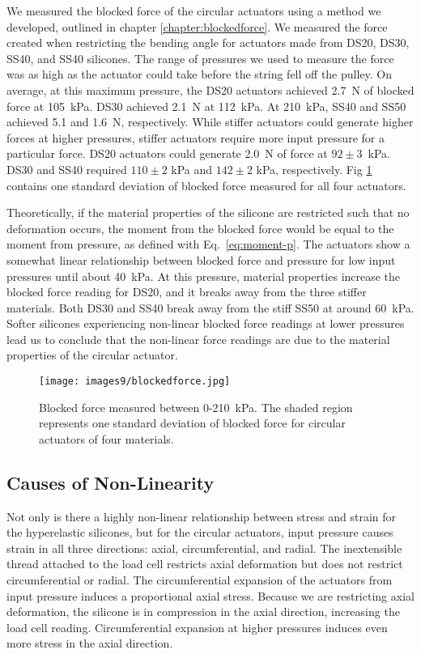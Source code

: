 We measured the blocked force of the circular actuators using a method we developed, outlined in chapter \ref{chapter:blockedforce}. We measured the force created when restricting the bending angle for actuators made from DS20, DS30, SS40, and SS40 silicones. The range of pressures we used to measure the force was as high as the actuator could take before the string fell off the pulley. On average, at this maximum pressure, the DS20 actuators achieved 2.7~N of blocked force at 105~kPa. DS30 achieved 2.1~N at 112~kPa. At 210~kPa, SS40 and SS50 achieved 5.1 and 1.6~N, respectively. While stiffer actuators could generate higher forces at higher pressures, stiffer actuators require more input pressure for a particular force. DS20 actuators could generate 2.0~N of force at $92\pm3$~kPa. DS30 and SS40 required $110\pm2$ kPa and $142\pm2$ kPa, respectively. Fig \ref{fig:blockedforce} contains one standard deviation of blocked force measured for all four actuators. 

Theoretically, if the material properties of the silicone are restricted such that no deformation occurs, the moment from the blocked force would be equal to the moment from pressure, as defined with Eq.~\ref{eq:moment-p}. The actuators show a somewhat linear relationship between blocked force and pressure for low input pressures until about 40~kPa. At this pressure, material properties increase the blocked force reading for DS20, and it breaks away from the three stiffer materials. Both DS30 and SS40 break away from the stiff SS50 at around 60~kPa. Softer silicones experiencing non-linear blocked force readings at lower pressures lead us to conclude that the non-linear force readings are due to the material properties of the circular actuator.
\\
\begin{figure}[ht]
    \centering
     \texttt{[image: images9/blockedforce.jpg]}
    \caption{Blocked force measured between 0-210~kPa. The shaded region represents one standard deviation of blocked force for circular actuators of four materials.}
    \label{fig:blockedforce}
\end{figure}

\clearpage
\subsection{Causes of Non-Linearity}

Not only is there a highly non-linear relationship between stress and strain for the hyperelastic silicones, but for the circular actuators, input pressure causes strain in all three directions: axial, circumferential, and radial. The inextensible thread attached to the load cell restricts axial deformation but does not restrict circumferential or radial. The circumferential expansion of the actuators from input pressure induces a proportional axial stress. Because we are restricting axial deformation, the silicone is in compression in the axial direction, increasing the load cell reading. Circumferential expansion at higher pressures induces even more stress in the axial direction. 

